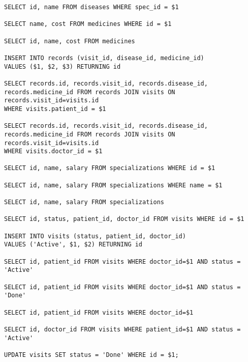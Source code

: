 \begin{appendices}
\begin{lstlisting}[caption={Запросы к базе данных(продолжение)}]
SELECT id, name FROM diseases WHERE spec_id = $1

SELECT name, cost FROM medicines WHERE id = $1

SELECT id, name, cost FROM medicines

INSERT INTO records (visit_id, disease_id, medicine_id) 
VALUES ($1, $2, $3) RETURNING id

SELECT records.id, records.visit_id, records.disease_id, 
records.medicine_id FROM records JOIN visits ON records.visit_id=visits.id 
WHERE visits.patient_id = $1

SELECT records.id, records.visit_id, records.disease_id, 
records.medicine_id FROM records JOIN visits ON records.visit_id=visits.id 
WHERE visits.doctor_id = $1

SELECT id, name, salary FROM specializations WHERE id = $1

SELECT id, name, salary FROM specializations WHERE name = $1

SELECT id, name, salary FROM specializations

SELECT id, status, patient_id, doctor_id FROM visits WHERE id = $1

INSERT INTO visits (status, patient_id, doctor_id) 
VALUES ('Active', $1, $2) RETURNING id

SELECT id, patient_id FROM visits WHERE doctor_id=$1 AND status = 'Active'

SELECT id, patient_id FROM visits WHERE doctor_id=$1 AND status = 'Done'

SELECT id, patient_id FROM visits WHERE doctor_id=$1

SELECT id, doctor_id FROM visits WHERE patient_id=$1 AND status = 'Active'

UPDATE visits SET status = 'Done' WHERE id = $1;

\end{lstlisting}

\end{appendices}